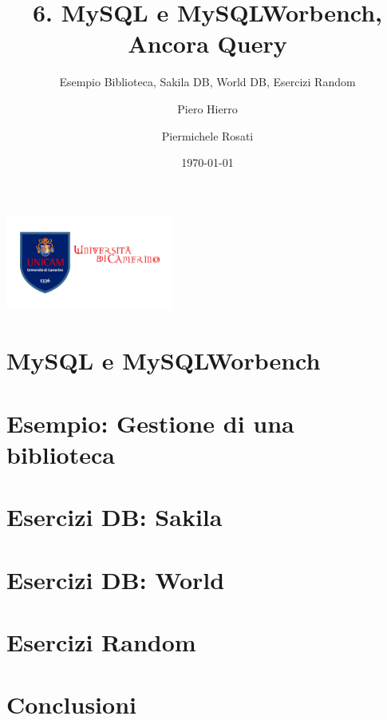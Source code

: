 \documentclass[11pt,aspectratio=169]{beamer}
\author[Piero Hierro \and Piermichele Rosati]{Piero Hierro \and Piermichele Rosati}
\institute[]{\large Universit\`a di Camerino\\ \footnotesize Tutorato - Basi di Dati}
\title[MySQL e MySQLWorbench, Ancora Query]{6. MySQL e MySQLWorbench, Ancora Query}
\subtitle{Esempio Biblioteca, Sakila DB, World DB, Esercizi Random}
\begin{document}
\begin{frame}
\centering
\includegraphics[width=5.5cm]{../img/unicam-logo.jpg}
\date{\today}
\titlepage
\end{frame}


\section{MySQL e MySQLWorbench}

%
\section{Esempio: Gestione di una biblioteca}

%
\section{Esercizi DB: Sakila}

%
\section{Esercizi DB: World}

%
\section{Esercizi Random}

\section{Conclusioni}
\end{document}
